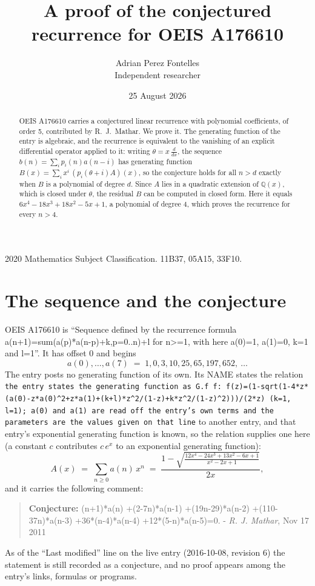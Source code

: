 \documentclass[11pt,a4paper]{article}
\title{A proof of the conjectured recurrence for OEIS A176610}
\author{Adrian Perez Fontelles\\ \small Independent researcher}
\date{25 August 2026}
\theoremstyle{plain}
\theoremstyle{definition}
\begin{document}
\maketitle

\begin{abstract}
OEIS A176610 carries a conjectured linear recurrence with polynomial coefficients, of
order 5, contributed by R.~J.~Mathar. We prove it. The generating function of the
entry is algebraic, and the recurrence is equivalent to the vanishing of an explicit
differential operator applied to it: writing $\theta=x\,\frac{d}{dx}$, the sequence
$b(n)=\sum_{i}p_{i}(n)a(n-i)$ has generating function
$B(x)=\sum_{i}x^{i}\,(p_{i}(\theta+i)A)(x)$, so the conjecture holds for all $n>d$ exactly
when $B$ is a polynomial of degree $d$. Since $A$ lies in a quadratic extension of
$\mathbb{Q}(x)$, which is closed under $\theta$, the residual $B$ can be computed in
closed form. Here it equals $6 x^{4} - 18 x^{3} + 18 x^{2} - 5 x + 1$, a polynomial of degree $4$, which proves
the recurrence for every $n>4$.
\end{abstract}

\noindent\small 2020 Mathematics Subject Classification. 11B37, 05A15, 33F10.\normalsize

\section{The sequence and the conjecture}

OEIS A176610 is ``Sequence defined by the recurrence formula a(n+1)=sum(a(p)*a(n-p)+k,p=0..n)+l for n>=1, with here a(0)=1, a(1)=0, k=1 and l=1''. It has offset $0$ and begins
\[
a(0),\dots,a(7)\;=\;1, 0, 3, 10, 25, 65, 197, 652,\ \dots
\]
The entry posts no generating function of its own. Its NAME states the
relation \texttt{the entry states the generating function as G.f f: f(z)=(1-sqrt(1-4*z*(a(0)-z*a(0)\textasciicircum{}2+z*a(1)+(k+l)*z\textasciicircum{}2/(1-z)+k*z\textasciicircum{}2/(1-z)\textasciicircum{}2)))/(2*z) (k=1, l=1); a(0) and a(1) are read off the entry's own terms and the parameters are the values given on that line} to another entry, and that entry's exponential generating
function is known, so the relation supplies one here (a constant $c$ contributes
$c\,e^{x}$ to an exponential generating function):
\begin{equation}\label{eq:gf}
A(x)\;=\;\sum_{n\ge 0} a(n)\,x^{n}\;=\;\frac{1 - \sqrt{\frac{12 x^{4} - 24 x^{3} + 13 x^{2} - 6 x + 1}{x^{2} - 2 x + 1}}}{2 x} ,
\end{equation}
and it carries the following comment:
\begin{quote}\small
\textbf{Conjecture:} (n+1)*a(n) +(2-7n)*a(n-1) +(19n-29)*a(n-2) +(110-37n)*a(n-3) +36*(n-4)*a(n-4) +12*(5-n)*a(n-5)=0. - \emph{R. J. Mathar}, Nov 17 2011
\end{quote}
As of the ``Last modified'' line on the live entry (2016-10-08, revision 6) the
statement is still recorded as a conjecture, and no proof appears among the entry's links,
formulas or programs.
\end{document}
